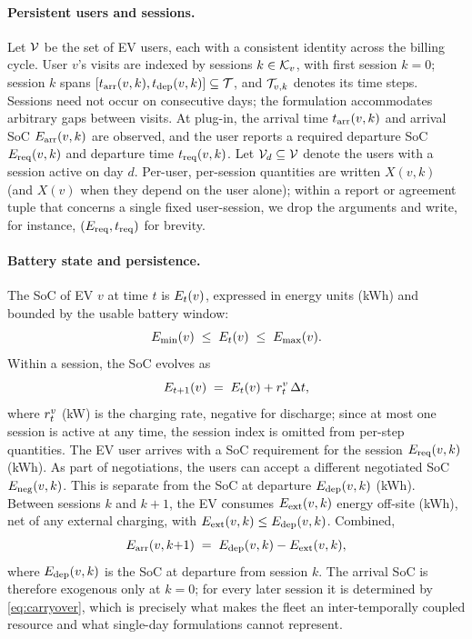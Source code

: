 \paragraph{Persistent users and sessions.} Let $\mathcal{V}$ be the set of EV
users, each with a consistent identity across the billing cycle. User $v$'s visits are indexed by sessions $k \in \mathcal{K}_{v}$, with first session $k = 0$; session $k$ spans $[t_{\mathrm{arr}}(v,k), t_{\mathrm{dep}}(v,k)] \subseteq \mathcal{T}$, and $\mathcal{T}_{v,k}$ denotes its time steps. Sessions need not occur on consecutive days; the formulation accommodates arbitrary gaps between visits. At plug-in, the arrival time $t_{\mathrm{arr}}(v,k)$ and arrival SoC $E_{\mathrm{arr}}(v,k)$ are observed, and the user reports a required departure SoC $E_{\mathrm{req}}(v,k)$ and departure time $t_{\mathrm{req}}(v,k)$. Let $\mathcal{V}_{d} \subseteq \mathcal{V}$ denote the users with a session active on day $d$. Per-user, per-session quantities are written $X(v,k)$ (and $X(v)$ when they depend on the user alone); within a report or agreement tuple that concerns a single fixed user-session, we drop the arguments and write, for instance, $(E_{\mathrm{req}}, t_{\mathrm{req}})$ for brevity.

\paragraph{Battery state and persistence.} The SoC of EV $v$ at time $t$
is $E_{t}(v)$, expressed in energy units (kWh) and bounded by the usable battery window:
\begin{equation}\label{eq:socbounds}
E_{\mathrm{min}}(v) \;\le\; E_{t}(v) \;\le\; E_{\mathrm{max}}(v).
\end{equation}
Within a session, the SoC evolves as
\begin{equation}\label{eq:soc}
E_{t+1}(v) \;=\; E_{t}(v) + r_{t}^{v}\,\Delta t,
\end{equation}
where $r_{t}^{v}$ (kW) is the charging rate, negative for discharge; since at most one session is active at any time, the session index is omitted from per-step quantities. The EV user arrives with a SoC requirement for the session $E_{\mathrm{req}}(v,k)$ (kWh). As part of negotiations, the users can accept a different negotiated SoC $E_{\mathrm{neg}}(v,k)$. This is separate from the SoC at departure $E_{\mathrm{dep}}(v,k)$ (kWh). Between sessions $k$ and $k{+}1$, the EV consumes $E_{\mathrm{ext}}(v,k)$ energy off-site (kWh), net of any external charging, with $E_{\mathrm{ext}}(v,k) \le E_{\mathrm{dep}}(v,k)$. Combined, 
\begin{equation}\label{eq:carryover}
E_{\mathrm{arr}}(v,k{+}1) \;=\; E_{\mathrm{dep}}(v,k) - E_{\mathrm{ext}}(v,k),
\end{equation}
where $E_{\mathrm{dep}}(v,k)$ is the SoC at departure from session $k$. The arrival SoC is therefore exogenous only at $k = 0$; for every later session it is determined by \eqref{eq:carryover}, which is precisely what makes the fleet an inter-temporally coupled resource and what single-day formulations cannot represent. 

